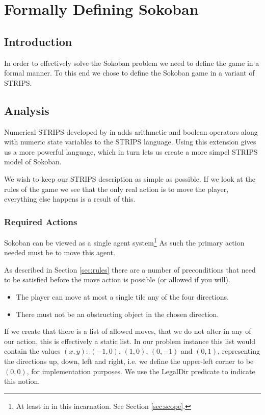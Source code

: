 \chapter{Formally Defining Sokoban}
\label{cha:strips}
\section{Introduction}
In order to effectively solve the Sokoban problem we need to define
the game in a formal manner. To this end we chose to define the
Sokoban game in a variant of STRIPS.



\section{Analysis}
Numerical STRIPS developed by \citet{Hoffmann03themetric-ff} in
\citeyear{Hoffmann03themetric-ff} adds arithmetic and boolean
operators along with numeric state variables to the STRIPS
language. Using this extension gives us a more powerful language,
which in turn lets us create a more simpel STRIPS model of Sokoban.

We wish to keep our STRIPS description as simple as possible. If we
look at the rules of the game we see that the only real action is to
move the player, everything else happens is a result of this.

\subsection{Required Actions}
Sokoban can be viewed as a single agent system\footnote{At least in in
  this incarnation. See Section \ref{sec:scope}.} As such the primary
action needed must be to move this agent.

As described in Section \ref{sec:rules} there are a number of
preconditions that need to be satisfied before the move action is
possible (or allowed if you will).

\begin{itemize}
\item The player can move at most a single tile any of the four
  directions.
\item There must not be an obstructing object in the chosen direction.
\end{itemize}

If we create that there is a list of allowed moves, that we do not
alter in any of our action, this is effectively a static list. In our
problem instance this list would contain the values $(x,y)$: $(-1,0)$,
$(1,0)$, $(0,-1)$ and $(0,1)$, representing the directions up, down,
left and right, i.e. we define the upper-left corner to be $(0,0)$,
for implementation purposes. We use the LegalDir predicate to indicate
this notion.


